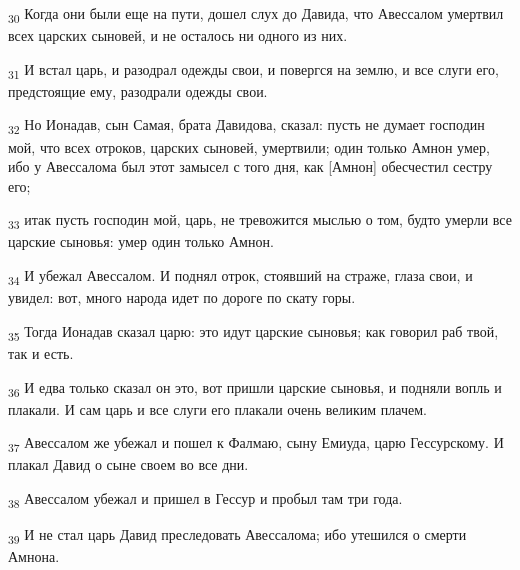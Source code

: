 \begin{tcolorbox}
\textsubscript{30} Когда они были еще на пути, дошел слух до Давида, что Авессалом умертвил всех царских сыновей, и не осталось ни одного из них.
\end{tcolorbox}
\begin{tcolorbox}
\textsubscript{31} И встал царь, и разодрал одежды свои, и повергся на землю, и все слуги его, предстоящие ему, разодрали одежды свои.
\end{tcolorbox}
\begin{tcolorbox}
\textsubscript{32} Но Ионадав, сын Самая, брата Давидова, сказал: пусть не думает господин мой, что всех отроков, царских сыновей, умертвили; один только Амнон умер, ибо у Авессалома был этот замысел с того дня, как [Амнон] обесчестил сестру его;
\end{tcolorbox}
\begin{tcolorbox}
\textsubscript{33} итак пусть господин мой, царь, не тревожится мыслью о том, будто умерли все царские сыновья: умер один только Амнон.
\end{tcolorbox}
\begin{tcolorbox}
\textsubscript{34} И убежал Авессалом. И поднял отрок, стоявший на страже, глаза свои, и увидел: вот, много народа идет по дороге по скату горы.
\end{tcolorbox}
\begin{tcolorbox}
\textsubscript{35} Тогда Ионадав сказал царю: это идут царские сыновья; как говорил раб твой, так и есть.
\end{tcolorbox}
\begin{tcolorbox}
\textsubscript{36} И едва только сказал он это, вот пришли царские сыновья, и подняли вопль и плакали. И сам царь и все слуги его плакали очень великим плачем.
\end{tcolorbox}
\begin{tcolorbox}
\textsubscript{37} Авессалом же убежал и пошел к Фалмаю, сыну Емиуда, царю Гессурскому. И плакал Давид о сыне своем во все дни.
\end{tcolorbox}
\begin{tcolorbox}
\textsubscript{38} Авессалом убежал и пришел в Гессур и пробыл там три года.
\end{tcolorbox}
\begin{tcolorbox}
\textsubscript{39} И не стал царь Давид преследовать Авессалома; ибо утешился о смерти Амнона.
\end{tcolorbox}
